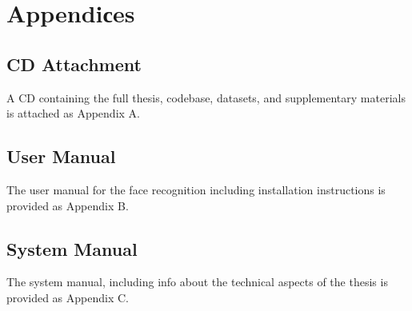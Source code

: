 \section*{Appendiсes}


\subsection*{CD Attachment}
A CD containing the full thesis, codebase, datasets, and supplementary materials is attached as Appendix A.

\subsection*{User Manual}
The user manual for the face recognition including installation instructions is provided as Appendix B.

\subsection*{System Manual}
The system manual, including info about the technical aspects of the thesis is provided as Appendix C.

